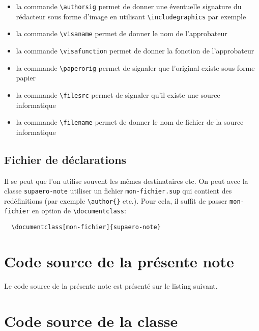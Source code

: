 \documentclass[french]{supaero-note}
\begin{document}
\begin{itemize}
\item la commande \verb!\authorsig! permet de donner une éventuelle
  signature du rédacteur sous forme d'image en utilisant
  \verb!\includegraphics! par exemple
\item la commande \verb!\visaname! permet de donner le nom de
  l'approbateur
\item la commande \verb!\visafunction! permet de donner la fonction de
  l'approbateur
\item la commande \verb!\paperorig! permet de signaler que l'original
  existe sous forme papier
\item la commande \verb!\filesrc! permet de signaler qu'il existe une
  source informatique
\item la commande \verb!\filename! permet de donner le nom de fichier
  de la source informatique
\end{itemize}

\subsection{Fichier de déclarations}
\label{sec:fich-de-decl}

Il se peut que l'on utilise souvent les mêmes destinataires etc. On
peut avec la classe \texttt{supaero-note} utiliser un fichier
\texttt{mon-fichier.sup} qui contient des redéfinitions (par exemple
\verb!\author{}! etc.). Pour cela, il suffit de passer
\verb!mon-fichier! en option de \verb!\documentclass!:

\begin{verbatim}
  \documentclass[mon-fichier]{supaero-note}
\end{verbatim}

\section{Code source de la présente note}
\label{sec:code-source}

Le code source de la présente note est présenté sur le listing
suivant.



\section{Code source de la classe}
\label{sec:code-source-supaero-note}





\end{document}
